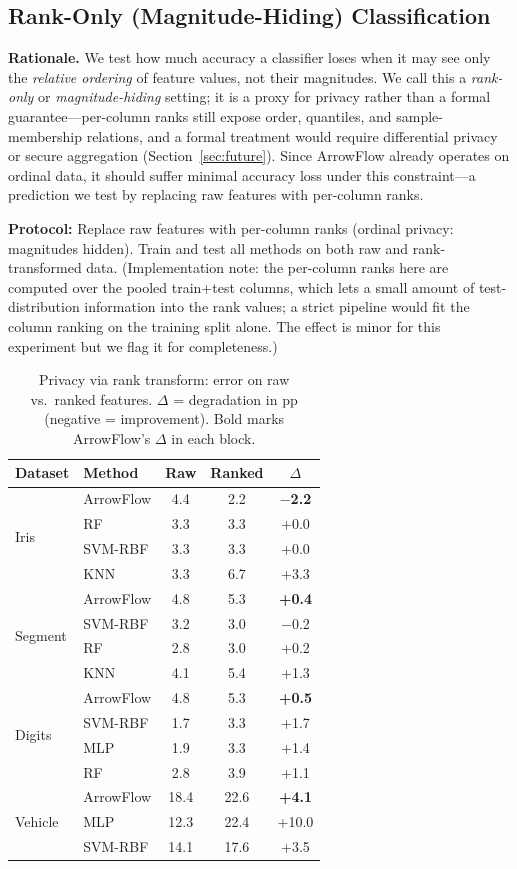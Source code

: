 \documentclass[12pt]{article}
\begin{document}
\subsection{Rank-Only (Magnitude-Hiding) Classification}
\label{sec:privacy}

\textbf{Rationale.} We test how much accuracy a classifier loses when it may see only the \emph{relative ordering} of feature values, not their magnitudes. We call this a \emph{rank-only} or \emph{magnitude-hiding} setting; it is a proxy for privacy rather than a formal guarantee---per-column ranks still expose order, quantiles, and sample-membership relations, and a formal treatment would require differential privacy or secure aggregation (Section~\ref{sec:future}). Since ArrowFlow already operates on ordinal data, it should suffer minimal accuracy loss under this constraint---a prediction we test by replacing raw features with per-column ranks.

\textbf{Protocol:} Replace raw features with per-column ranks (ordinal privacy: magnitudes hidden). Train and test all methods on both raw and rank-transformed data. (Implementation note: the per-column ranks here are computed over the pooled train+test columns, which lets a small amount of test-distribution information into the rank values; a strict pipeline would fit the column ranking on the training split alone. The effect is minor for this experiment but we flag it for completeness.)

\begin{table}[ht]
\centering
\caption{Privacy via rank transform: error on raw vs.\ ranked features. $\Delta$ = degradation in pp (negative = improvement). Bold marks ArrowFlow's $\Delta$ in each block.}
\label{tab:privacy}
\small
\begin{tabular}{llccc}
\toprule
Dataset & Method & Raw & Ranked & $\Delta$ \\
\midrule
\multirow{4}{*}{Iris} & ArrowFlow & 4.4 & 2.2 & \textbf{$-$2.2} \\
 & RF & 3.3 & 3.3 & +0.0 \\
 & SVM-RBF & 3.3 & 3.3 & +0.0 \\
 & KNN & 3.3 & 6.7 & +3.3 \\
\midrule
\multirow{4}{*}{Segment} & ArrowFlow & 4.8 & 5.3 & \textbf{+0.4} \\
 & SVM-RBF & 3.2 & 3.0 & $-$0.2 \\
 & RF & 2.8 & 3.0 & +0.2 \\
 & KNN & 4.1 & 5.4 & +1.3 \\
\midrule
\multirow{4}{*}{Digits} & ArrowFlow & 4.8 & 5.3 & \textbf{+0.5} \\
 & SVM-RBF & 1.7 & 3.3 & +1.7 \\
 & MLP & 1.9 & 3.3 & +1.4 \\
 & RF & 2.8 & 3.9 & +1.1 \\
\midrule
\multirow{3}{*}{Vehicle} & ArrowFlow & 18.4 & 22.6 & \textbf{+4.1} \\
 & MLP & 12.3 & 22.4 & +10.0 \\
 & SVM-RBF & 14.1 & 17.6 & +3.5 \\
\bottomrule
\end{tabular}
\end{table}
\end{document}
